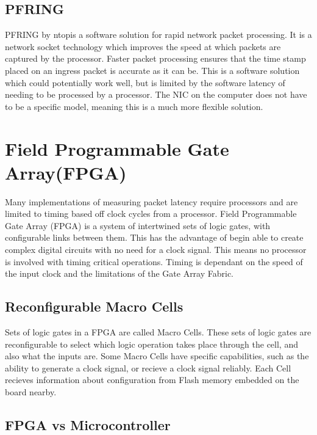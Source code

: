 \subsection{PF\textunderscore RING}

\par PF\textunderscore RING by ntop\texttrademark is a software solution for rapid network packet processing.
It is a network socket technology which improves the speed at which packets are captured by the processor.
Faster packet processing ensures that the time stamp placed on an ingress packet is accurate as it can be.
This is a software solution which could potentially work well, but is limited by the software latency of needing to be processed by a processor.
The NIC on the computer does not have to be a specific model, meaning this is a much more flexible solution.

\section{Field Programmable Gate Array(FPGA)}

\par Many implementations of measuring packet latency require processors and are limited to timing based off clock cycles from a processor.
Field Programmable Gate Array (FPGA) is a system of intertwined sets of logic gates, with configurable links between them.
This has the advantage of begin able to create complex digital circuits with no need for a clock signal.
This means no processor is involved with timing critical operations.
Timing is dependant on the speed of the input clock and the limitations of the Gate Array Fabric.

\subsection{Reconfigurable Macro Cells}

\par Sets of logic gates in a FPGA are called Macro Cells. 
These sets of logic gates are reconfigurable to select which logic operation takes place through the cell, and also what the inputs are.
Some Macro Cells have specific capabilities, such as the ability to generate a clock signal, or recieve a clock signal reliably.
Each Cell recieves information about configuration from Flash memory embedded on the board nearby.

\subsection{FPGA vs Microcontroller}
